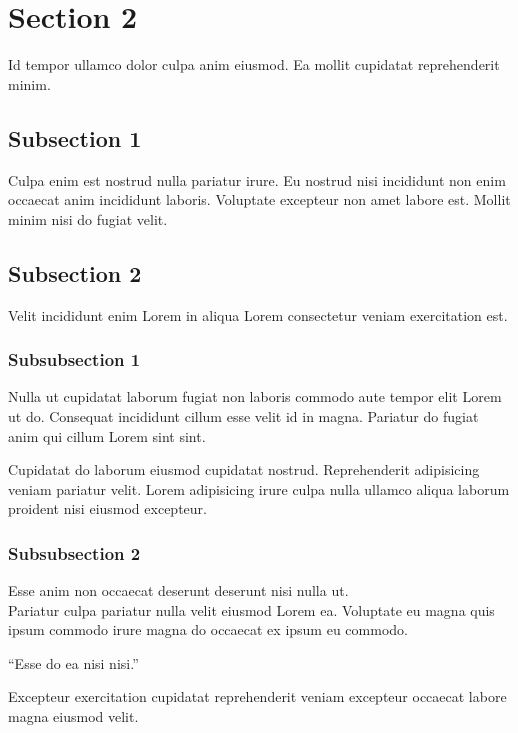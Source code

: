 \documentclass
    [   %
        repeatauthor,           %
        a4paper                 %
    ]{uhhassignment}
\begin{document}
\section{Section 2}
Id tempor ullamco dolor culpa anim eiusmod. Ea mollit cupidatat reprehenderit minim.

\subsection{Subsection 1}
\label{subsec: Subsection1}
Culpa enim est nostrud nulla pariatur irure. Eu nostrud nisi incididunt non enim occaecat anim incididunt laboris. 
Voluptate excepteur non amet labore est. Mollit minim nisi do fugiat velit.

\subsection{Subsection 2}
Velit incididunt enim Lorem in aliqua Lorem consectetur veniam exercitation est.

\subsubsection{Subsubsection 1}
Nulla ut cupidatat laborum fugiat non laboris commodo aute tempor elit Lorem ut do. 
Consequat incididunt cillum esse velit id in magna. Pariatur do fugiat anim qui cillum Lorem sint sint. 

Cupidatat do laborum eiusmod cupidatat nostrud. Reprehenderit adipisicing veniam pariatur velit. 
Lorem adipisicing irure culpa nulla ullamco aliqua laborum proident nisi eiusmod excepteur.

\subsubsection{Subsubsection 2}
Esse anim non occaecat deserunt deserunt nisi nulla ut.\\
Pariatur culpa pariatur nulla velit eiusmod Lorem ea. 
Voluptate eu magna quis ipsum commodo irure magna do occaecat ex ipsum eu commodo. 

\enquote{Esse do ea nisi nisi.}

Excepteur exercitation cupidatat reprehenderit veniam excepteur occaecat labore magna eiusmod velit.
\end{document}
